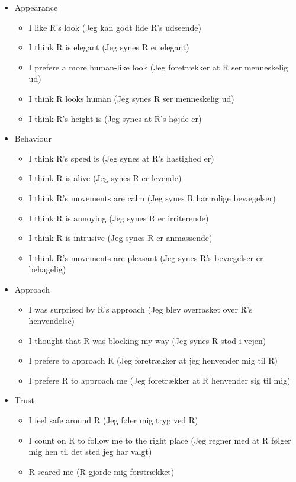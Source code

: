 \begin{itemize}
\item Appearance 
  \begin{itemize}
  \item I like R's look (Jeg kan godt lide R's udseende)
  \item I think R is elegant (Jeg synes R er elegant)
  \item I prefere a more human-like look (Jeg foretrækker at R ser menneskelig ud)
  \item I think R looks human (Jeg synes R ser menneskelig ud)
  \item I think R's height is (Jeg synes at R's højde er)
\end{itemize}
\item Behaviour
  \begin{itemize}
  \item I think R's speed is (Jeg synes at R's hastighed er)
  \item I think R is alive (Jeg synes R er levende)
  \item I think R's movements are calm (Jeg synes R har rolige bevægelser)
  \item I think R is annoying (Jeg synes R er irriterende)
  \item I think R is intrusive (Jeg synes R er anmassende)
  \item I think R's movements are pleasant (Jeg synes R's bevægelser er behagelig)
\end{itemize}
\item Approach 
\begin{itemize}
  \item I was surprised by R's approach (Jeg blev overrasket over R's henvendelse)
  \item I thought that R was blocking my way (Jeg synes R stod i vejen) 
  \item I prefere to approach R (Jeg foretrækker at jeg henvender mig til R)
  \item I prefere R to approach me (Jeg foretrækker at R henvender sig til mig) 
\end{itemize}
\item Trust
\begin{itemize}
  \item I feel safe around R (Jeg føler mig tryg ved R)
  \item I count on R to follow me to the right place (Jeg regner med at R følger mig hen til det sted jeg har valgt) 
  \item R scared me (R gjorde mig forstrækket)\\
\end{itemize}
\end{itemize}
